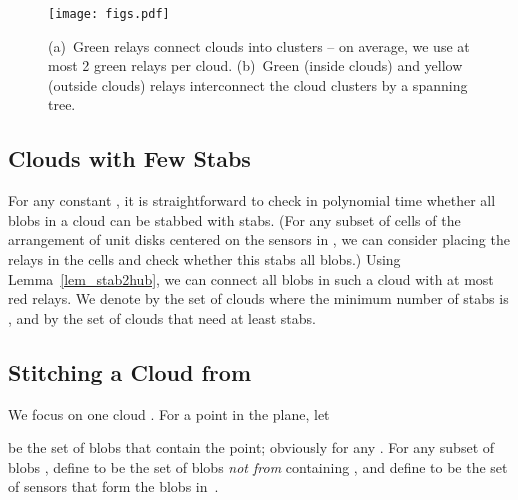 \documentclass[11pt,a4paper]{article}
\theoremstyle{definition}
\theoremstyle{remark}
\begin{document}
\begin{figure}\centering
\texttt{[image: figs.pdf]}
\caption{(a)~Green relays connect clouds into clusters -- on average, we use at most 2 green relays per cloud. (b)~Green (inside clouds) and yellow (outside clouds) relays interconnect the cloud clusters by a spanning tree.}\label{fig:greenyellow}
\end{figure}

\subsection{Clouds with Few Stabs}

For any constant , it is straightforward to check in polynomial time whether all blobs in a cloud  can be stabbed with  stabs. (For any subset of  cells of the arrangement of unit disks centered on the sensors in , we can consider placing the relays in the cells and check whether this stabs all blobs.)  Using Lemma~\ref{lem_stab2hub}, we can connect all blobs in such a cloud with at most  red relays. We denote by  the set of clouds where the minimum number of stabs is , and by  the set of clouds that need at least  stabs.

\subsection{Stitching a Cloud from \texorpdfstring{}{Ck+}}

We focus on one cloud . For a point  in the plane, let

be the set of blobs that contain the point; obviously  for any . For any subset of blobs , define  to be the set of blobs \emph{not from } containing , and define  to be the set of sensors that form the blobs in~.
\end{document}
